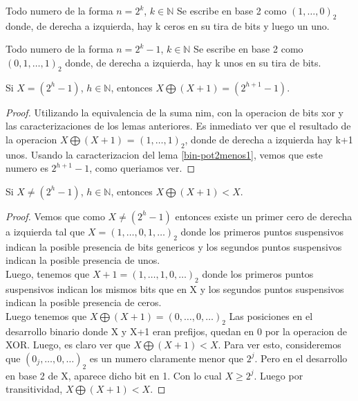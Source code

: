 \begin{lemma}
	Todo numero de la forma $n = 2^k$, $ k \in \mathbb{N}$ Se escribe en base 2 como $(1, \dots, 0)_2$ donde, de derecha a izquierda, hay k ceros en su tira de bits y luego un uno.
\end{lemma}

\begin{lemma}
	\label{bin-pot2menos1}
	Todo numero de la forma $n = 2^k - 1$, $ k \in \mathbb{N}$ Se escribe en base 2 como $(0, 1, \dots, 1)_2$ donde, de derecha a izquierda, hay k unos en su tira de bits.
\end{lemma}

\begin{theorem}
Si $X = (2^h - 1)$, $h \in \mathbb{N}$, entonces $X \bigoplus (X+1) = (2^{h+1} - 1)$.\\
\end{theorem}
\begin{proof}
	Utilizando la equivalencia de la suma nim, con la operacion de bits xor y las caracterizaciones de los lemas anteriores. Es inmediato ver que el resultado de la operacion $X \bigoplus (X+1)$ = $(1, \dots, 1)_2$, donde de derecha a izquierda hay k+1 unos. Usando la caracterizacion del lema \ref{bin-pot2menos1}, vemos que este numero es $2^{h+1}-1$, como queriamos ver.
\end{proof}

\begin{theorem}
Si $X \neq (2^h - 1)$, $h \in \mathbb{N}$, entonces $X \bigoplus (X+1) < X $.\\
\end{theorem}
\begin{proof}
Vemos que como $X \neq (2^h - 1)$ entonces existe un primer cero de derecha a izquierda tal que $X = (1, \dots, 0, 1, \dots)_2 $ donde los primeros puntos suspensivos indican la posible presencia de bits genericos y los segundos puntos suspensivos indican la posible presencia de unos.\\
Luego, tenemos que $X + 1 = (1, \dots, 1, 0, \dots)_2 $ donde los primeros puntos suspensivos indican los mismos bits que en X y los segundos puntos suspensivos indican la posible presencia de ceros.\\
Luego tenemos que $X \bigoplus (X+1) = (0, \dots, 0, \dots)_2$ Las posiciones en el desarrollo binario donde X y X+1 eran prefijos, quedan en 0 por la operacion de XOR. Luego, es claro ver que $X \bigoplus (X+1) < X$.
Para ver esto, consideremos que $(0_{j}, \dots, 0, \dots)_2$ es un numero claramente menor que $2^{j}$.
Pero en el desarrollo en base 2 de X, aparece dicho bit en 1. Con lo cual $ X \geq 2^{j} $. Luego por transitividad, $X \bigoplus (X+1) < X$.
\end{proof}

